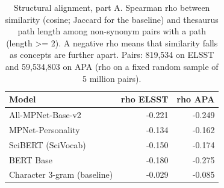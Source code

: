 \begin{table}[ht]
\centering
\small
\caption{Structural alignment, part A. Spearman rho between similarity (cosine; Jaccard for the baseline) and thesaurus path length among non-synonym pairs with a path (length >= 2). A negative rho means that similarity falls as concepts are further apart. Pairs: 819,534 on ELSST and 59,534,803 on APA (rho on a fixed random sample of 5 million pairs).}
\label{tab:table6a_structural_similarity}
\begin{tabular}{lrr}
\toprule
Model & rho ELSST & rho APA \\
\midrule
All-MPNet-Base-v2 & -0.221 & -0.249 \\
MPNet-Personality & -0.134 & -0.162 \\
SciBERT (SciVocab) & -0.150 & -0.174 \\
BERT Base & -0.180 & -0.275 \\
Character 3-gram (baseline) & -0.029 & -0.085 \\
\bottomrule
\end{tabular}
\end{table}
